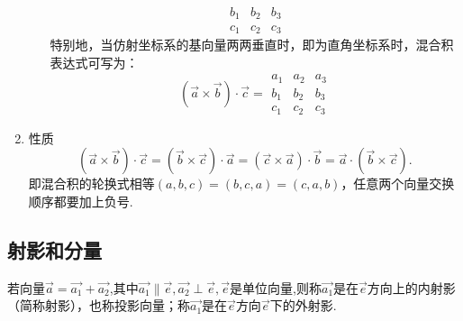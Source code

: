 \begin{enumerate}[1.]
\begin{enumerate}[]
{\begin{equation}
\begin{array}{|ccc|}
					b_1 & b_2 & b_3 \\
					c_1 & c_2 & c_3
				\end{array}
			\end{equation}
			特别地，当仿射坐标系的基向量两两垂直时，即为直角坐标系时，混合积表达式可写为：
			\begin{equation}
				(\overrightarrow{a} \times \overrightarrow{b})\cdot \overrightarrow{c}=
				\begin{array}{|ccc|}
					a_1 & a_2 & a_3 \\
					b_1 & b_2 & b_3 \\
					c_1 & c_2 & c_3
				\end{array}
			\end{equation}
		}
	\end{enumerate}
	\item {\color{dy2}性质}
	\begin{equation}
		\left( \overrightarrow{a}\times \overrightarrow{b}\right) \cdot \overrightarrow{c}=\left( \overrightarrow{b}\times \overrightarrow{c}\right) \cdot \overrightarrow{a}=\left( \overrightarrow{c}\times\overrightarrow{a}\right) \cdot \overrightarrow{b}=\overrightarrow{a}\cdot \left( \overrightarrow{b}\times \overrightarrow{c}\right) .
	\end{equation}
	即混合积的轮换式相等$(a,b,c)=(b,c,a)=(c,a,b)$，任意两个向量交换顺序都要加上负号. \\
\end{enumerate}
\subsection{射影和分量}
\tdefination[射影]
\hspace*{0.3cm} 若向量$\overrightarrow{a}=\overrightarrow{ a_1}+\overrightarrow{a_2}$,其中$\overrightarrow{a_1}\parallel \overrightarrow{e},\overrightarrow{ a_2}\perp \overrightarrow{e},\overrightarrow{e}$是单位向量,则称$\overrightarrow{a_1}$是在$\overrightarrow{e}$方向上的{\color{dy}内射影（简称射影）}，也称{\color{dy}投影向量}；称$\overrightarrow{a_1}$是在$\overrightarrow{e}$方向$\overrightarrow{e}$下的{\color{dy}外射影}.

